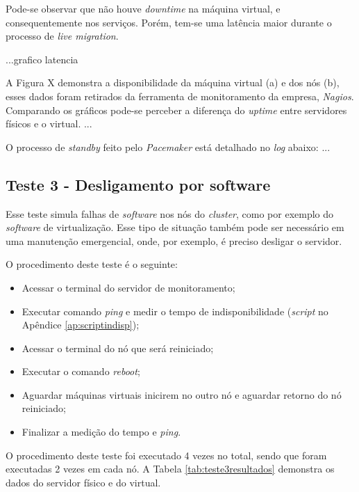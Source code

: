 Pode-se observar que não houve \textit{downtime} na máquina virtual, e consequentemente nos serviços.
Porém, tem-se uma latência maior durante o processo de \textit{live migration}.

...grafico latencia

A Figura X demonstra a disponibilidade da máquina virtual (a) e dos nós (b), esses dados foram retirados da ferramenta de monitoramento da empresa,
\textit{Nagios}. Comparando os gráficos pode-se perceber a diferença do \textit{uptime} entre servidores físicos e o virtual.
...

O processo de \textit{standby} feito pelo \textit{Pacemaker} está detalhado no \textit{log} abaixo:
...

\subsection{Teste 3 - Desligamento por software}

Esse teste simula falhas de \textit{software} nos nós do \textit{cluster}, como por exemplo do \textit{software} de virtualização. Esse tipo de 
situação também pode ser necessário em uma manutenção emergencial, onde, por exemplo, é preciso desligar o servidor.

O procedimento deste teste é o seguinte:
\begin{itemize}
 \item Acessar o terminal do servidor de monitoramento;
 \item Executar comando \textit{ping} e medir o tempo de indisponibilidade (\textit{script} no Apêndice \ref{ap:scriptindisp});
 \item Acessar o terminal do nó que será reiniciado;
 \item Executar o comando \textit{reboot};
 \item Aguardar máquinas virtuais inicirem no outro nó e aguardar retorno do nó reiniciado;
 \item Finalizar a medição do tempo e \textit{ping}.
\end{itemize}

O procedimento deste teste foi executado 4 vezes no total, sendo que foram executadas 2 vezes em cada nó. A Tabela \ref{tab:teste3resultados}
demonstra os dados do servidor físico e do virtual.

